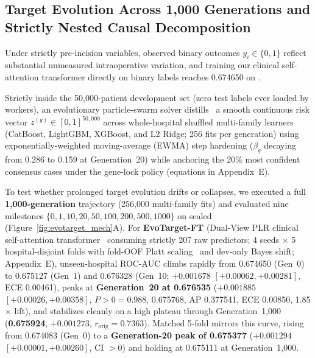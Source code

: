 

\subsection{Target Evolution Across 1,000 Generations and Strictly Nested Causal Decomposition}
Under strictly pre-incision variables, observed binary outcomes $y_i \in \{0,1\}$ reflect substantial unmeasured intraoperative variation, and training our clinical self-attention transformer directly on binary labels reaches 0.674650 on .

Strictly inside the 50,000-patient development set (zero test labels ever loaded by workers), an evolutionary particle-swarm solver distills~\cite{hinton2015distilling} a smooth continuous risk vector $z^{(g)} \in [0,1]^{50{,}000}$ across whole-hospital shuffled multi-family learners (CatBoost, LightGBM, XGBoost, and L2 Ridge; 256 fits per generation) using exponentially-weighted moving-average (EWMA) step hardening ($\beta_g$ decaying from 0.286 to 0.159 at Generation~20) while anchoring the 20\% most confident consensus cases under the gene-lock policy (equations in Appendix~E).

To test whether prolonged target evolution drifts or collapses, we executed a full \textbf{1,000-generation} trajectory (256,000 multi-family fits) and evaluated nine milestones $\{0, 1, 10, 20, 50, 100, 200, 500, 1000\}$ on sealed  (Figure~\ref{fig:evotarget_mech}A). For \textbf{EvoTarget-FT} (Dual-View PLR clinical self-attention transformer~\cite{gorishniy2021revisiting,gorishniy2022embeddings} consuming strictly 207 raw predictors; 4 seeds $\times$ 5 hospital-disjoint folds with fold-OOF Platt scaling~\cite{platt1999probabilistic} and dev-only Bayes shift; Appendix~E), unseen-hospital ROC-AUC climbs rapidly from 0.674650 (Gen~0) to 0.675127 (Gen~1) and 0.676328 (Gen~10; $+0.001678$ $[+0.00062, +0.00281]$, ECE 0.00461), peaks at \textbf{Generation~20 at 0.676535} (\textbf{$+0.001885$} $[+0.00026, +0.00358]$, $P>0 = 0.988$,  0.675768, AP 0.377541, ECE 0.00850, 1.85$\times$ lift), and stabilizes cleanly on a high plateau through Generation~1,000 (\textbf{0.675924}, $+0.001273$, $r_{\mathrm{orig}}=0.7363$). Matched 5-fold  mirrors this curve, rising from 0.674083 (Gen~0) to a \textbf{Generation-20 peak of 0.675377} (\textbf{$+0.001294$} $[+0.00001, +0.00260]$, CI $>0$) and holding at 0.675111 at Generation~1,000.

